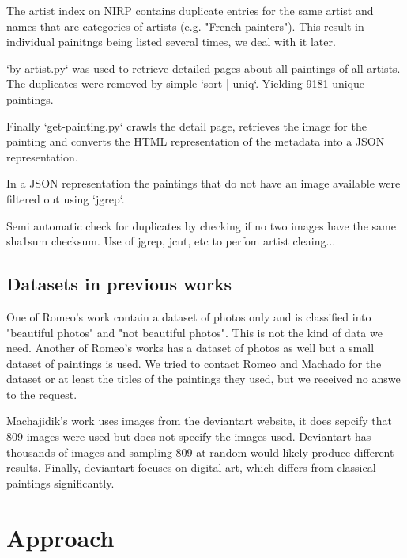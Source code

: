 \documentclass[11pt,a4paper,draft]{report}
\begin{document}
\begin{multicols}{2}
The artist index on NIRP contains duplicate entries for the same artist and
names that are categories of artists (e.g. "French painters").  This result in
individual painitngs being listed several times, we deal with it later.

`by-artist.py` was used to retrieve detailed pages about all paintings of all
artists.  The duplicates were removed by simple `sort | uniq`.  Yielding 9181
unique paintings.

Finally `get-painting.py` crawls the detail page, retrieves the image for the
painting and converts the HTML representation of the metadata into a JSON
representation.

In a JSON representation the paintings that do not have an image available were
filtered out using `jgrep`.

Semi automatic check for duplicates by checking if no two images have the same
sha1sum checksum.  Use of jgrep, jcut, etc to perfom artist cleaing...

\section{Datasets in previous works}

One of Romeo's work contain a dataset of photos only and is classified into
"beautiful photos" and "not beautiful photos".  This is not the kind of data we
need.  Another of Romeo's works has a dataset of photos as well but a small
dataset of paintings is used.  We tried to contact Romeo and Machado for the
dataset or at least the titles of the paintings they used, but we received no
answe to the request.

Machajidik's work uses images from the deviantart website, it does sepcify that
809 images were used but does not specify the images used.  Deviantart has
thousands of images and sampling 809 at random would likely produce different
results.  Finally, deviantart focuses on digital art, which differs from
classical paintings significantly.

\end{multicols}

\chapter{Approach}  %
\end{document}
